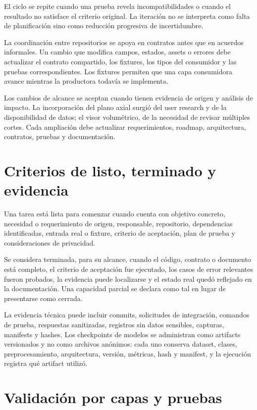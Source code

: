 El ciclo se repite cuando una prueba revela incompatibilidades o cuando el resultado no satisface el criterio original. La iteración no se interpreta como falta de planificación sino como reducción progresiva de incertidumbre.

La coordinación entre repositorios se apoya en contratos antes que en acuerdos informales. Un cambio que modifica campos, estados, assets o errores debe actualizar el contrato compartido, los fixtures, los tipos del consumidor y las pruebas correspondientes. Los fixtures permiten que una capa consumidora avance mientras la productora todavía se implementa.

Los cambios de alcance se aceptan cuando tienen evidencia de origen y análisis de impacto. La incorporación del plano axial surgió del user research y de la disponibilidad de datos; el visor volumétrico, de la necesidad de revisar múltiples cortes. Cada ampliación debe actualizar requerimientos, roadmap, arquitectura, contratos, pruebas y documentación.

\section{Criterios de listo, terminado y evidencia}

Una tarea está lista para comenzar cuando cuenta con objetivo concreto, necesidad o requerimiento de origen, responsable, repositorio, dependencias identificadas, entrada real o fixture, criterio de aceptación, plan de prueba y consideraciones de privacidad.

Se considera terminada, para su alcance, cuando el código, contrato o documento está completo, el criterio de aceptación fue ejecutado, los casos de error relevantes fueron probados, la evidencia puede localizarse y el estado real quedó reflejado en la documentación. Una capacidad parcial se declara como tal en lugar de presentarse como cerrada.

La evidencia técnica puede incluir commits, solicitudes de integración, comandos de prueba, respuestas sanitizadas, registros sin datos sensibles, capturas, manifests y hashes. Los checkpoints de modelos se administran como artifacts versionados y no como archivos anónimos: cada uno conserva dataset, clases, preprocesamiento, arquitectura, versión, métricas, hash y manifest, y la ejecución registra qué artifact utilizó.

\section{Validación por capas y pruebas}

